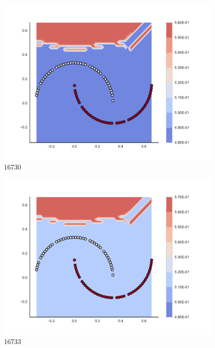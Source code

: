 \begin{subfigure}[b]{0.09\textwidth}
    \includegraphics[clip, trim=2.35cm 1.75cm 4.5cm 0cm,width=\textwidth]{img/convergence/16730.pdf}
    \caption{16730}
    \label{fig:convergence_16730}
\end{subfigure}
%
\begin{subfigure}[b]{0.09\textwidth}
    \includegraphics[clip, trim=2.35cm 1.75cm 4.5cm 0cm,width=\textwidth]{img/convergence/16733.pdf}
    \caption{16733}
    \label{fig:convergence_16733}
\end{subfigure}
%
